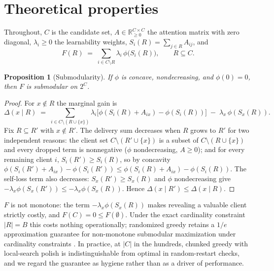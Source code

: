 \documentclass{article} %
\newtheorem{proposition}{Proposition}
\begin{document}



\appendix

\section{Theoretical properties}
\label{app:theory}

Throughout, $C$ is the candidate set, $A \in \mathbb{R}_{\geq 0}^{C \times C}$ the attention matrix with zero diagonal, $\lambda_i \geq 0$ the learnability weights, $S_i(R) = \sum_{j \in R} A_{ij}$, and
\[
F(R) \;=\; \sum_{i \in C \setminus R} \lambda_i\, \phi\big(S_i(R)\big), \qquad R \subseteq C .
\]

\begin{proposition}[Submodularity]
\label{prop:submodular}
If $\phi$ is concave, nondecreasing, and $\phi(0) = 0$, then $F$ is submodular on $2^C$.
\end{proposition}

\begin{proof}
For $x \notin R$ the marginal gain is
\[
\Delta(x \mid R) \;=\; \sum_{i \in C \setminus (R \cup \{x\})} \lambda_i \big[\phi(S_i(R) + A_{ix}) - \phi(S_i(R))\big] \;-\; \lambda_x\, \phi(S_x(R)).
\]
Fix $R \subseteq R'$ with $x \notin R'$. The delivery sum decreases when $R$ grows to $R'$ for two independent reasons: the client set $C \setminus (R' \cup \{x\})$ is a subset of $C \setminus (R \cup \{x\})$ and every dropped term is nonnegative ($\phi$ nondecreasing, $A \geq 0$); and for every remaining client $i$, $S_i(R') \geq S_i(R)$, so by concavity $\phi(S_i(R') + A_{ix}) - \phi(S_i(R')) \leq \phi(S_i(R) + A_{ix}) - \phi(S_i(R))$. The self-loss term also decreases: $S_x(R') \geq S_x(R)$ and $\phi$ nondecreasing give $-\lambda_x \phi(S_x(R')) \leq -\lambda_x \phi(S_x(R))$. Hence $\Delta(x \mid R') \leq \Delta(x \mid R)$.
\end{proof}

$F$ is not monotone: the term $-\lambda_x \phi(S_x(R))$ makes revealing a valuable client strictly costly, and $F(C) = 0 \leq F(\emptyset)$. Under the exact cardinality constraint $|R| = B$ this costs nothing operationally; randomized greedy retains a $1/e$ approximation guarantee for non-monotone submodular maximization under cardinality constraints \citep{buchbinder2014submodular}. In practice, at $|C|$ in the hundreds, chunked greedy with local-search polish is indistinguishable from optimal in random-restart checks, and we regard the guarantee as hygiene rather than as a driver of performance.
\end{document}
